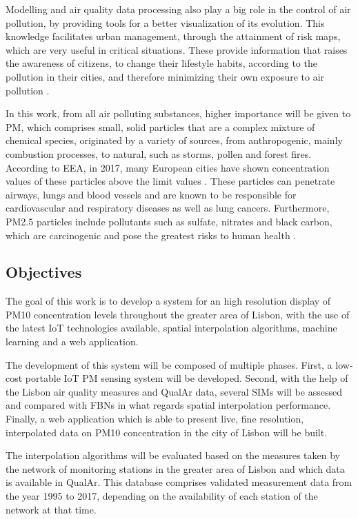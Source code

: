 Modelling and air quality data processing also play a big role in the control of air pollution, by providing tools for a better visualization of its evolution. This knowledge facilitates urban management, through the attainment of risk maps, which are very useful in critical situations. These provide information that raises the awareness of citizens, to change their lifestyle habits, according to the pollution in their cities, and therefore minimizing their own exposure to air pollution \cite{GSMA2018}.

In this work, from all air polluting substances, higher importance will be given to \ac{PM}, which comprises small, solid particles that are a complex mixture of chemical species, originated by a variety of sources, from anthropogenic, mainly combustion processes, to natural, such as storms, pollen and forest fires. According to \ac{EEA}, in 2017, many European cities have shown concentration values of these particles above the limit values \cite{EEA2018}. These particles can penetrate airways, lungs and blood vessels and are known to be responsible for cardiovascular and respiratory diseases as well as lung cancers. Furthermore, PM2.5 particles include pollutants such as sulfate, nitrates and black carbon, which are carcinogenic and pose the greatest risks to human health \cite{WHO2018}.

\subsection{Objectives}

The goal of this work is to develop a system for an high resolution display of PM10 concentration levels throughout the greater area of Lisbon, with the use of the latest IoT technologies available, spatial interpolation algorithms, machine learning and a web application.

The development of this system will be composed of multiple phases. First, a low-cost portable IoT PM sensing system will be developed. Second, with the help of the Lisbon air quality measures and QualAr data, several \ac{SIM}s will be assessed and compared with \ac{FBN}s in what regards spatial interpolation performance. Finally, a web application which is able to present live, fine resolution, interpolated data on PM10 concentration in the city of Lisbon will be built.

The interpolation algorithms will be evaluated based on the measures taken by the network of monitoring stations in the greater area of Lisbon and which data is available in QualAr. This database comprises validated measurement data from the year 1995 to 2017, depending on the availability of each station of the network at that time.

